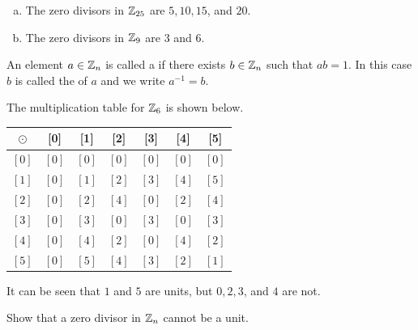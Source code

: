\documentclass[11pt,fleqn,dvipsnames,usenames]{article}
\newcommand{\p}{\noindent}
\begin{document}
\begin{examples}\phantom{-}

\begin{enumerate}[(a)]
\item The zero divisors in $\mathbb{Z}_{25}$ are $5, 10, 15$, and $20$.
\item The zero divisors in $\mathbb{Z}_9$ are $3$ and $6$.
\end{enumerate}
\end{examples}
%
\begin{definition}
An element $a\in\mathbb{Z}_{n}$ is called a  if there exists $b\in \mathbb{Z}_{n}$ such that $ab = 1$.  In this case $b$ is called the  of $a$ and we write $a^{-1} = b$.
\end{definition}
%
\newpage
%
\begin{example}
The multiplication table for $\mathbb{Z}_6$ is shown below.  
\bgroup
\begin{center}
\def\arraystretch{1.5}
\begin{tabular}{c|cccccc}
$\odot$ & [0] & [1] & [2] & [3] & [4] & [5]\\
\hline
$[0]$ & $[0]$ & $[0]$ & $[0]$ & $[0]$ & $[0]$ & $[0]$\\
$[1]$ & $[0]$ & $[1]$ & $[2]$ & $[3]$ & $[4]$ & $[5]$\\
$[2]$ & $[0]$ & $[2]$ & $[4]$ & $[0]$ & $[2]$ & $[4]$\\
$[3]$ & $[0]$ & $[3]$ & $[0]$ & $[3]$ & $[0]$ & $[3]$\\
$[4]$ & $[0]$ & $[4]$ & $[2]$ & $[0]$ & $[4]$ & $[2]$\\
$[5]$ & $[0]$ & $[5]$ & $[4]$ & $[3]$ & $[2]$ & $[1]$ 
\end{tabular}
\end{center}
\egroup
\p It can be seen that $1$ and $5$ are units, but $0,2,3$, and $4$ are not.
\end{example}

\begin{exercise}\label{zerodivisorcannotbeunitZn} Show that a zero divisor in $\mathbb{Z}_{n}$ cannot be a unit.\end{exercise}
\end{document}
